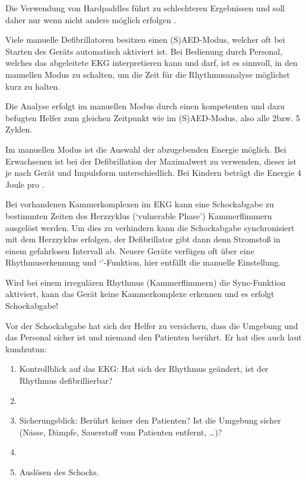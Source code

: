 {\begin{description}
  Die Verwendung von Hardpaddles führt zu schlechteren Ergebnissen 
  und soll daher nur wenn nicht anders möglich erfolgen 
  \cite{Erc-2015-Section-03,Erc-2015-Sektion-03-De}. 
  \item[Manueller Modus] 
  Viele manuelle Defibrillatoren besitzen einen (S)AED-Modus, 
  welcher oft bei Starten des Geräts automatisch aktiviert ist.
  Bei Bedienung durch Personal, 
  welches das abgeleitete EKG interpretieren kann und darf, 
  ist es sinnvoll, 
  in den manuellen Modus zu schalten, 
  um die Zeit für die Rhythmusanalyse möglichst kurz zu halten.
  \item[Analyse] 
  Die Analyse erfolgt im manuellen Modus durch einen kompetenten 
  und dazu befugten Helfer 
  zum gleichen Zeitpunkt wie im (S)AED-Modus,
  also alle 2\Min* 
  bzw. 5 Zyklen.
  \item[Auswahl der Energie] 
  Im manuellen Modus ist die Auswahl der abzugebenden Energie möglich. 
  Bei Erwachsenen ist bei der Defibrillation der Maximalwert zu verwenden, dieser ist je nach Gerät und Impulsform unterschiedlich. Bei Kindern beträgt die Energie 4 Joule pro {\Kg}.
  \item[Synchronisation] 
  Bei vorhandenen Kammerkomplexen im EKG kann eine Schockabgabe zu bestimmten Zeiten des Herzzyklus (\enquote*{vulnerable Phase}) Kammerflimmern ausgelöst werden. 
  Um dies zu verhindern kann die Schockabgabe synchronisiert mit dem Herzzyklus erfolgen, der Defibrillator gibt dann denn Stromstoß in einem gefahrlosen Intervall ab.
  Neuere Geräte verfügen oft über eine Rhythmuserkennung und \enquote*{}-Funktion, hier entfällt die manuelle Einstellung.
  \begin{Danger}
    \item Wird bei einem irregulären Rhythmus 
    (Kammerflimmern) 
    die Sync-Funktion aktiviert, 
    kann das Gerät keine Kammerkomplexe erkennen 
    und es erfolgt  Schockabgabe!
  \end{Danger}
  \item[Schockabgabe] Vor der Schockabgabe hat sich der Helfer zu versichern, dass die Umgebung und das Personal sicher ist und niemand den Patienten berührt. Er hat dies auch laut kundzutun:
  \begin{enumerate}
    \item Kontrollblick auf das EKG: Hat sich der Rhythmus geändert, ist der Rhythmus defibrillierbar?
    \item {}
    \item Sicherungsblick: Berührt keiner den Patienten? Ist die Umgebung sicher (Nässe, Dämpfe, Sauerstoff vom Patienten entfernt, \ldots)?
    \item {}
    \item Auslösen des Schocks.
  \end{enumerate}
\end{description}

}
